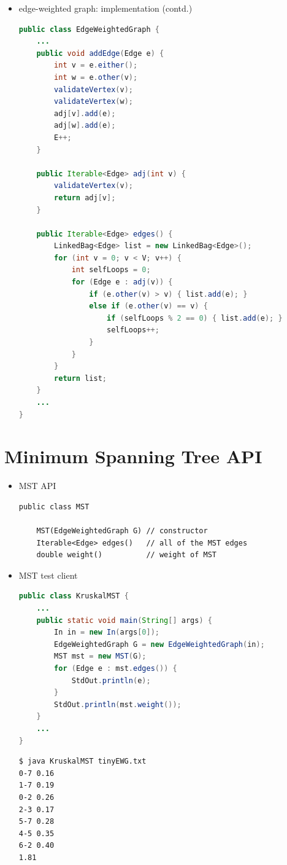 \documentclass[8pt,a4paper,compress]{beamer}
\begin{document}
\begin{frame}[fragile]
\begin{itemize}
\item edge-weighted graph: implementation (contd.)
\begin{lstlisting}[language=Java]
public class EdgeWeightedGraph {
    ...
    public void addEdge(Edge e) {
        int v = e.either();
        int w = e.other(v);
        validateVertex(v);
        validateVertex(w);
        adj[v].add(e);
        adj[w].add(e);
        E++;
    }

    public Iterable<Edge> adj(int v) {
        validateVertex(v);
        return adj[v];
    }

    public Iterable<Edge> edges() {
        LinkedBag<Edge> list = new LinkedBag<Edge>();
        for (int v = 0; v < V; v++) {
            int selfLoops = 0;
            for (Edge e : adj(v)) {
                if (e.other(v) > v) { list.add(e); }
                else if (e.other(v) == v) {
                    if (selfLoops % 2 == 0) { list.add(e); }
                    selfLoops++;
                }
            }
        }
        return list;
    }
    ...
}
\end{lstlisting}
\end{itemize}
\end{frame}

\section{Minimum Spanning Tree API}
\begin{frame}[fragile]
\begin{itemize}
\item MST API
\begin{lstlisting}[language={},mathescape]
public class MST
    
    MST(EdgeWeightedGraph G) // constructor
    Iterable<Edge> edges()   // all of the MST edges
    double weight()          // weight of MST
\end{lstlisting}

\item MST test client
\begin{lstlisting}[language=Java]
public class KruskalMST {
    ...
    public static void main(String[] args) {
        In in = new In(args[0]);
        EdgeWeightedGraph G = new EdgeWeightedGraph(in);
        MST mst = new MST(G);
        for (Edge e : mst.edges()) { 
            StdOut.println(e);
        }
        StdOut.println(mst.weight());
    }
    ...
}
\end{lstlisting}

\begin{lstlisting}[language={}]
$ java KruskalMST tinyEWG.txt
0-7 0.16
1-7 0.19
0-2 0.26
2-3 0.17
5-7 0.28
4-5 0.35
6-2 0.40
1.81
\end{lstlisting}
\end{itemize}
\end{frame}
\end{document}
